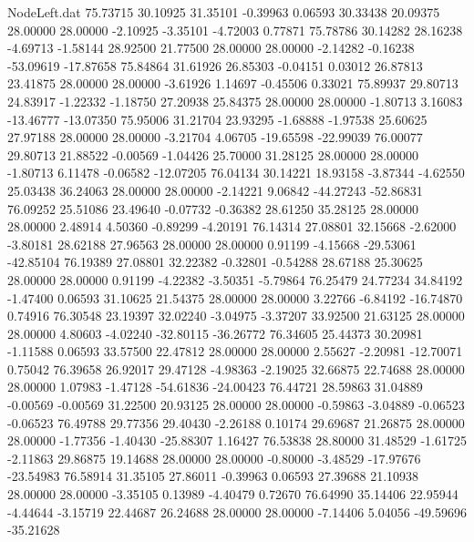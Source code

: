 \begin{filecontents}{NodeLeft.dat}
  75.73715   30.10925   31.35101    -0.39963    0.06593   30.33438   20.09375   28.00000   28.00000   -2.10925   -3.35101   -4.72003    0.77871
  75.78786   30.14282   28.16238    -4.69713   -1.58144   28.92500   21.77500   28.00000   28.00000   -2.14282   -0.16238  -53.09619  -17.87658
  75.84864   31.61926   26.85303    -0.04151    0.03012   26.87813   23.41875   28.00000   28.00000   -3.61926    1.14697   -0.45506    0.33021
  75.89937   29.80713   24.83917    -1.22332   -1.18750   27.20938   25.84375   28.00000   28.00000   -1.80713    3.16083  -13.46777  -13.07350
  75.95006   31.21704   23.93295    -1.68888   -1.97538   25.60625   27.97188   28.00000   28.00000   -3.21704    4.06705  -19.65598  -22.99039
  76.00077   29.80713   21.88522    -0.00569   -1.04426   25.70000   31.28125   28.00000   28.00000   -1.80713    6.11478   -0.06582  -12.07205
  76.04134   30.14221   18.93158    -3.87344   -4.62550   25.03438   36.24063   28.00000   28.00000   -2.14221    9.06842  -44.27243  -52.86831
  76.09252   25.51086   23.49640    -0.07732   -0.36382   28.61250   35.28125   28.00000   28.00000    2.48914    4.50360   -0.89299   -4.20191
  76.14314   27.08801   32.15668    -2.62000   -3.80181   28.62188   27.96563   28.00000   28.00000    0.91199   -4.15668  -29.53061  -42.85104
  76.19389   27.08801   32.22382    -0.32801   -0.54288   28.67188   25.30625   28.00000   28.00000    0.91199   -4.22382   -3.50351   -5.79864
  76.25479   24.77234   34.84192    -1.47400    0.06593   31.10625   21.54375   28.00000   28.00000    3.22766   -6.84192  -16.74870    0.74916
  76.30548   23.19397   32.02240    -3.04975   -3.37207   33.92500   21.63125   28.00000   28.00000    4.80603   -4.02240  -32.80115  -36.26772
  76.34605   25.44373   30.20981    -1.11588    0.06593   33.57500   22.47812   28.00000   28.00000    2.55627   -2.20981  -12.70071    0.75042
  76.39658   26.92017   29.47128    -4.98363   -2.19025   32.66875   22.74688   28.00000   28.00000    1.07983   -1.47128  -54.61836  -24.00423
  76.44721   28.59863   31.04889    -0.00569   -0.00569   31.22500   20.93125   28.00000   28.00000   -0.59863   -3.04889   -0.06523   -0.06523
  76.49788   29.77356   29.40430    -2.26188    0.10174   29.69687   21.26875   28.00000   28.00000   -1.77356   -1.40430  -25.88307    1.16427
  76.53838   28.80000   31.48529    -1.61725   -2.11863   29.86875   19.14688   28.00000   28.00000   -0.80000   -3.48529  -17.97676  -23.54983
  76.58914   31.35105   27.86011    -0.39963    0.06593   27.39688   21.10938   28.00000   28.00000   -3.35105    0.13989   -4.40479    0.72670
  76.64990   35.14406   22.95944    -4.44644   -3.15719   22.44687   26.24688   28.00000   28.00000   -7.14406    5.04056  -49.59696  -35.21628

\end{filecontents}
